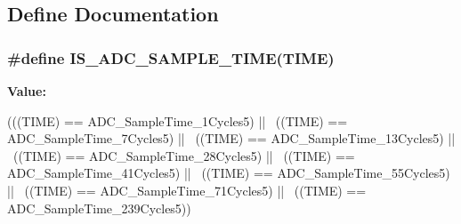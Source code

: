 \subsection{Define Documentation}
\hypertarget{group__ADC__sampling__time_ga30e0307fa009e1c383d3047b48e94644}{
\subsubsection[{IS\_\-ADC\_\-SAMPLE\_\-TIME}]{\setlength{\rightskip}{0pt plus 5cm}\#define IS\_\-ADC\_\-SAMPLE\_\-TIME(TIME)}}
\label{group__ADC__sampling__time_ga30e0307fa009e1c383d3047b48e94644}
{\bfseries Value:}
\begin{DoxyCode}
(((TIME) == ADC_SampleTime_1Cycles5) || \
                                  ((TIME) == ADC_SampleTime_7Cycles5) || \
                                  ((TIME) == ADC_SampleTime_13Cycles5) || \
                                  ((TIME) == ADC_SampleTime_28Cycles5) || \
                                  ((TIME) == ADC_SampleTime_41Cycles5) || \
                                  ((TIME) == ADC_SampleTime_55Cycles5) || \
                                  ((TIME) == ADC_SampleTime_71Cycles5) || \
                                  ((TIME) == ADC_SampleTime_239Cycles5))
\end{DoxyCode}
